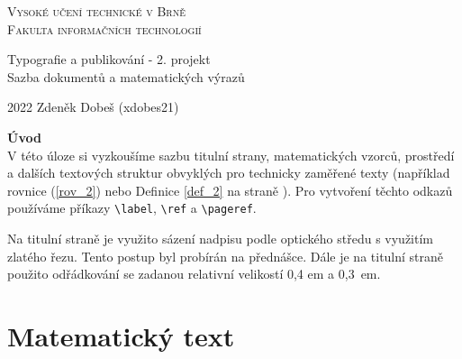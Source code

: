 \documentclass[11pt,twocolumn,a4paper]{article}
\begin{document}
\begin{titlepage}
    \begin{center}
        \textsc{\Huge Vysoké učení technické v Brně             
        \bigskip \\}
        \textsc{\huge Fakulta informačních technologií}
        
        {\LARGE Typografie a publikování - 2. projekt \\
            \vspace{0.3em}
        Sazba dokumentů a matematických výrazů}
        
        {\Large 2022 \hfill 
        Zdeněk Dobeš (xdobes21)}
    \end{center}
\end{titlepage}
\noindent
    \textbf{\Large Úvod} \\
    
\noindent
V této úloze si vyzkoušíme sazbu titulní strany, matematic\-kých vzorců, prostředí a dalších textových struktur obvyklých pro technicky zaměřené texty (například rovnice (\ref{rov_2}) nebo Definice \ref{def_2} na straně \pageref{def_2}). Pro vytvoření těchto odkazů používáme příkazy
\texttt{\textbackslash label}, \texttt{\textbackslash ref} a \texttt{\textbackslash pageref}.

Na titulní straně je využito sázení nadpisu podle optického středu s využitím zlatého řezu. Tento postup byl probírán na přednášce. Dále je na titulní straně použito odřádkování se zadanou relativní velikostí 0,4 em a 0,3~em.

\section{Matematický text}
\end{document}
